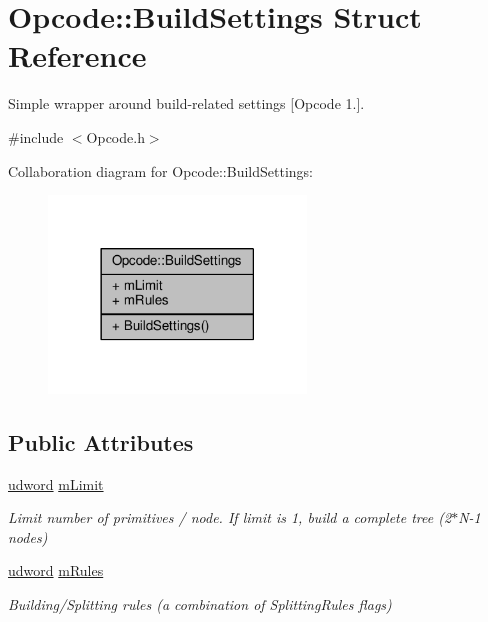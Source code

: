 \hypertarget{structOpcode_1_1BuildSettings}{}\section{Opcode\+:\+:Build\+Settings Struct Reference}
\label{structOpcode_1_1BuildSettings}


Simple wrapper around build-\/related settings \mbox{[}Opcode 1.\mbox{]}.  




{\ttfamily \#include $<$Opcode.\+h$>$}



Collaboration diagram for Opcode\+:\+:Build\+Settings\+:
\nopagebreak
\begin{figure}[H]
\begin{center}
\leavevmode
\includegraphics[width=194pt]{dc/dad/structOpcode_1_1BuildSettings__coll__graph}
\end{center}
\end{figure}
\subsection*{Public Attributes}
\begin{DoxyCompactItemize}
\item 
\hyperlink{IceTypes_8h_a44c6f1920ba5551225fb534f9d1a1733}{udword} \hyperlink{structOpcode_1_1BuildSettings_a468d86ed95f23fc22035e3d89c21fb28}{m\+Limit}\hypertarget{structOpcode_1_1BuildSettings_a468d86ed95f23fc22035e3d89c21fb28}{}\label{structOpcode_1_1BuildSettings_a468d86ed95f23fc22035e3d89c21fb28}

\begin{DoxyCompactList}\small\item\em Limit number of primitives / node. If limit is 1, build a complete tree (2$\ast$\+N-\/1 nodes) \end{DoxyCompactList}\item 
\hyperlink{IceTypes_8h_a44c6f1920ba5551225fb534f9d1a1733}{udword} \hyperlink{structOpcode_1_1BuildSettings_a912528f21ae40e1d1ccbd15e3d1a28e2}{m\+Rules}\hypertarget{structOpcode_1_1BuildSettings_a912528f21ae40e1d1ccbd15e3d1a28e2}{}\label{structOpcode_1_1BuildSettings_a912528f21ae40e1d1ccbd15e3d1a28e2}

\begin{DoxyCompactList}\small\item\em Building/\+Splitting rules (a combination of Splitting\+Rules flags) \end{DoxyCompactList}\end{DoxyCompactItemize}



